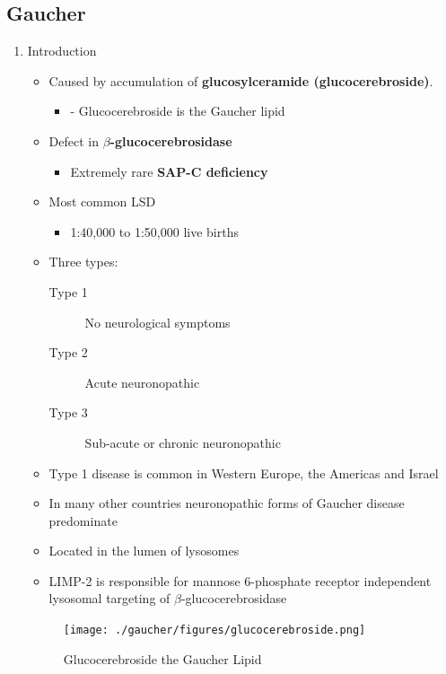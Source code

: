 \documentclass{scrartcl}
\begin{document}
\subsection{Gaucher}
\label{sec:org2c56115}
\begin{enumerate}
\item Introduction
\label{sec:org128b886}
\begin{itemize}
\item Caused by accumulation of \textbf{glucosylceramide (glucocerebroside)}.
\begin{itemize}
\item - Glucocerebroside is the Gaucher lipid
\end{itemize}
\item Defect in \textbf{\(\beta\)-glucocerebrosidase}
\begin{itemize}
\item Extremely rare \textbf{SAP-C deficiency}
\end{itemize}
\item Most common LSD
\begin{itemize}
\item 1:40,000 to 1:50,000 live births
\end{itemize}
\item Three types:
\begin{description}
\item[{Type 1}] No neurological symptoms
\item[{Type 2}] Acute neuronopathic
\item[{Type 3}] Sub-acute or chronic neuronopathic
\end{description}
\item Type 1 disease is common in Western Europe, the Americas and Israel
\item In many other countries neuronopathic forms of Gaucher disease predominate
\end{itemize}


\begin{itemize}
\item Located in the lumen of lysosomes
\item LIMP-2 is responsible for mannose 6-phosphate receptor independent
lysosomal targeting of \(\beta\)-glucocerebrosidase
\end{itemize}

\begin{figure}[htbp]
\centering
\texttt{[image: ./gaucher/figures/glucocerebroside.png]}
\caption{\label{fig:org1458b56}
Glucocerebroside the Gaucher Lipid}
\end{figure}


\end{enumerate}
\end{document}
